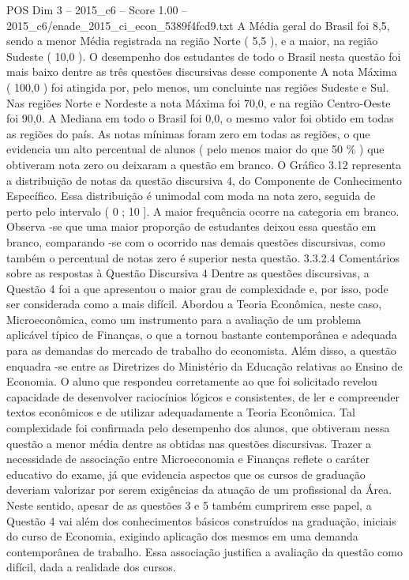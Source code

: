 \begin{textsample}{POS Dim 3 – 2015\_c6 – Score 1.00 – 2015\_c6/enade\_2015\_ci\_econ\_5389f4fcd9.txt}
A Média geral do Brasil foi 8,5, sendo a menor Média registrada na região Norte ( 5,5 ), e a maior, na região Sudeste ( 10,0 ).
O desempenho dos estudantes de todo o Brasil nesta questão foi mais baixo dentre as três questões discursivas desse componente A nota Máxima ( 100,0 ) foi atingida por, pelo menos, um concluinte nas regiões Sudeste e Sul.
Nas regiões Norte e Nordeste a nota Máxima foi 70,0, e na região Centro-Oeste foi 90,0.
A Mediana em todo o Brasil foi 0,0, o mesmo valor foi obtido em todas as regiões do país.
As notas mínimas foram zero em todas as regiões, o que evidencia um alto percentual de alunos ( pelo menos maior do que 50 \% ) que obtiveram nota zero ou deixaram a questão em branco.
O Gráfico 3.12 representa a distribuição de notas da questão discursiva 4, do Componente de Conhecimento Específico.
Essa distribuição é unimodal com moda na nota zero, seguida de perto pelo intervalo ( 0 ; 10 ].
A maior frequência ocorre na categoria em branco.
Observa -se que uma maior proporção de estudantes deixou essa questão em branco, comparando -se com o ocorrido nas demais questões discursivas, como também o percentual de notas zero é superior nesta questão. 3.3.2.4 Comentários sobre as respostas à Questão Discursiva 4 Dentre as questões discursivas, a Questão 4 foi a que apresentou o maior grau de complexidade e, por isso, pode ser considerada como a mais difícil.
Abordou a Teoria Econômica, neste caso, Microeconômica, como um instrumento para a avaliação de um problema aplicável típico de Finanças, o que a tornou bastante contemporânea e adequada para as demandas do mercado de trabalho do economista.
Além disso, a questão enquadra -se entre as Diretrizes do Ministério da Educação relativas ao Ensino de Economia.
O aluno que respondeu corretamente ao que foi solicitado revelou capacidade de desenvolver raciocínios lógicos e consistentes, de ler e compreender textos econômicos e de utilizar adequadamente a Teoria Econômica.
Tal complexidade foi confirmada pelo desempenho dos alunos, que obtiveram nessa questão a menor média dentre as obtidas nas questões discursivas.
Trazer a necessidade de associação entre Microeconomia e Finanças reflete o caráter educativo do exame, já que evidencia aspectos que os cursos de graduação deveriam valorizar por serem exigências da atuação de um profissional da Área.
Neste sentido, apesar de as questões 3 e 5 também cumprirem esse papel, a Questão 4 vai além dos conhecimentos básicos construídos na graduação, iniciais do curso de Economia, exigindo aplicação dos mesmos em uma demanda contemporânea de trabalho.
Essa associação justifica a avaliação da questão como difícil, dada a realidade dos cursos.

\end{textsample}
